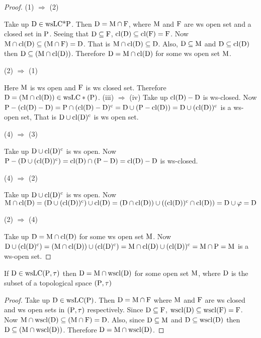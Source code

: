 \begin{proof}
(1) $\Rightarrow$ (2)

Take up $\mathrm{D} \in \mathrm{ws}\mathrm{LC}\text{*}\mathrm{P}$. Then $\mathrm{D} = \mathrm{M} \cap \mathrm{F}$, where $\mathrm{M}$ and $\mathrm{F}$ are ws open set and a closed set in $\mathrm{P}$. Seeing that $\mathrm{D} \subseteq \mathrm{F}$, $\mathrm{cl}(\mathrm{D}) \subseteq \mathrm{cl}(\mathrm{F}) = \mathrm{F}$. Now $\mathrm{M} \cap \mathrm{cl}(\mathrm{D}) \subseteq (\mathrm{M} \cap \mathrm{F}) = \mathrm{D}$. That is $\mathrm{M} \cap \mathrm{cl}(\mathrm{D}) \subseteq \mathrm{D}$. Also, $\mathrm{D} \subseteq \mathrm{M}$ and $\mathrm{D} \subseteq\mathrm{cl}(\mathrm{D})$ then $\mathrm{D} \subseteq (\mathrm{M} \cap \mathrm{cl}(\mathrm{D}))$. Therefore $\mathrm{D}= \mathrm{M} \cap \mathrm{cl}(\mathrm{D})$ for some ws open set $\mathrm{M}$.

(2) $\Rightarrow$ (1)

Here $\mathrm{M}$ is ws open and $\mathrm{F}$ is ws closed set. Therefore $\mathrm{D} = (\mathrm{M} \cap \mathrm{cl}(\mathrm{D})) \in \mathrm{ws}\mathrm{LC} * (\mathrm{P})$. (iii) $\Rightarrow$ (iv) Take up $\mathrm{cl}(\mathrm{D}) - \mathrm{D}$ is ws-closed. Now $\mathrm{P} - (\mathrm{cl}(\mathrm{D}) - \mathrm{D}) = \mathrm{P} \cap (\mathrm{cl}(\mathrm{D}) - \mathrm{D})^{\text{c}} = \mathrm{D} \cup (\mathrm{P} - \mathrm{cl}(\mathrm{D})) = \mathrm{D} \cup (\mathrm{cl}(\mathrm{D}))^{\text{c}}$ is a ws-open set, That is $\mathrm{D} \cup \mathrm{cl}(\mathrm{D})^{\text{c}}$ is ws open set.

(4) $\Rightarrow$ (3)

Take up $\mathrm{D} \cup \mathrm{cl}(\mathrm{D})^{\text{c}}$ is ws open. Now $\mathrm{P} - (\mathrm{D} \cup (\mathrm{cl}(\mathrm{D}))^{\text{c}}) = \mathrm{cl}(\mathrm{D}) \cap (\mathrm{P} - \mathrm{D}) = \mathrm{cl}(\mathrm{D}) - \mathrm{D}$ is ws-closed.

(4) $\Rightarrow$ (2)

Take up $\mathrm{D} \cup \mathrm{cl}(\mathrm{D})^{\text{c}}$ is ws open. Now $\mathrm{M}\cap \mathrm{cl}(\mathrm{D}) = (\mathrm{D} \cup (\mathrm{cl}(\mathrm{D}))^{\text{c}}) \cup \mathrm{cl}(\mathrm{D}) = (\mathrm{D} \cap \mathrm{cl}(\mathrm{D})) \cup ((\mathrm{cl}(\mathrm{D}))^{\text{c}} \cap \mathrm{cl}(\mathrm{D})) = \mathrm{D} \cup \varphi = \mathrm{D}$

(2) $\Rightarrow$ (4)

Take up $\mathrm{D} = \mathrm{M} \cap \mathrm{cl}(\mathrm{D})$ for some ws open set $\mathrm{M}$. Now $\mathrm{D} \cup (\mathrm{cl}(\mathrm{D})^{\text{c}}) = (\mathrm{M} \cap \mathrm{cl}(\mathrm{D})) \cup (\mathrm{cl}(\mathrm{D})^{\text{c}}) = \mathrm{M} \cap \mathrm{cl}(\mathrm{D}) \cup (\mathrm{cl}(\mathrm{D}))^{\text{c}} = \mathrm{M} \cap \mathrm{P} = \mathrm{M}$ is a ws-open set.
\end{proof}

\begin{thm}\label{thm7.2.11}
If $\mathrm{D} \in \mathrm{ws}\mathrm{LC}(\mathrm{P}, \tau)$ then $\mathrm{D} = \mathrm{M}\cap \mathrm{ws}\mathrm{cl}(\mathrm{D})$ for some open set $\mathrm{M}$, where $\mathrm{D}$ is the subset of a topological space $(\mathrm{P}, \tau)$
\end{thm}

\begin{proof}
Take up $\mathrm{D} \in \mathrm{ws}\mathrm{LC}(\mathrm{P})$. Then $\mathrm{D} = \mathrm{M} \cap \mathrm{F}$ where $\mathrm{M}$ and $\mathrm{F}$ are ws closed and ws open sets in $(\mathrm{P},\tau)$ respectively. Since $\mathrm{D} \subseteq \mathrm{F}$, $\mathrm{ws}\mathrm{cl}(\mathrm{D}) \subseteq \mathrm{ws}\mathrm{cl}(\mathrm{F})=\mathrm{F}$. Now $\mathrm{M} \cap \mathrm{ws}\mathrm{cl}(\mathrm{D}) \subseteq (\mathrm{M} \cap \mathrm{F}) = \mathrm{D}$. Also, since $\mathrm{D} \subseteq \mathrm{M}$ and $\mathrm{D} \subseteq \mathrm{ws}\mathrm{cl}(\mathrm{D})$ then $\mathrm{D} \subseteq (\mathrm{M} \cap \mathrm{ws}\mathrm{cl}(\mathrm{D}))$. Therefore $\mathrm{D} = \mathrm{M} \cap \mathrm{ws}\mathrm{cl}(\mathrm{D})$.
\end{proof}


